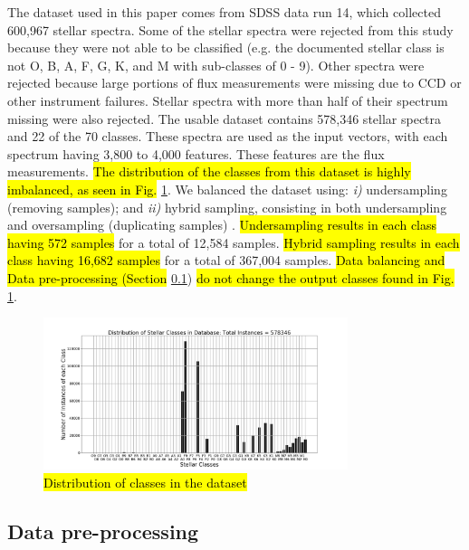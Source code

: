 \documentclass[conference]{IEEEtran}
\DeclareRobustCommand{\hlcyan}[1]{{\sethlcolor{cyan}\hl{#1}}}
\begin{document}
	The dataset used in this paper comes from SDSS data run 14, which collected 600,967 stellar spectra. Some of the stellar spectra were rejected from this study because they were not able to be classified (e.g. the documented stellar class is not O, B, A, F, G, K, and M with sub-classes of 0 - 9). Other spectra were rejected because large portions of flux measurements were missing due to CCD or other instrument failures. Stellar spectra with more than half of their spectrum missing were also rejected. The usable dataset contains 578,346 stellar spectra and 22 of the 70 classes. These spectra are used as the input vectors, with each spectrum having 3,800 to 4,000 features. These features are the flux measurements. \hlcyan{The distribution of the classes from this dataset is highly imbalanced, as seen in Fig.} \ref{fig:dist}. We balanced the dataset using: \textit{i)} undersampling (removing samples); and \textit{ii)}  hybrid sampling, consisting in both undersampling and oversampling (duplicating samples)  \cite{Japkowicz}. \hlcyan{Undersampling results in each class having 572 samples} for a total of 12,584 samples. \hlcyan{Hybrid sampling results in each class having 16,682 samples} for a total of 367,004 samples. \hlcyan{Data balancing and Data pre-processing (Section} \ref{sec:pre-proc}) \hlcyan{do not change the output classes found in Fig.} \ref{fig:dist}. 

        \begin{figure}
            \centering
            \includegraphics[width=3.5in]{Distribution.png}
            \caption{\hlcyan{Distribution of classes in the dataset}}
            \label{fig:dist}
        \end{figure}


	\subsection{Data pre-processing}\label{sec:pre-proc}
\end{document}
